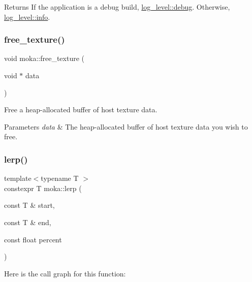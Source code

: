 \begin{DoxyReturn}{Returns}
If the application is a debug build, \mbox{\hyperlink{namespacemoka_a7c4111664aee7737c54ab37376b2637daad42f6697b035b7580e4fef93be20b4d}{log\+\_\+level\+::debug}}. Otherwise, \mbox{\hyperlink{namespacemoka_a7c4111664aee7737c54ab37376b2637dacaf9b6b99962bf5c2264824231d7a40c}{log\+\_\+level\+::info}}. 
\end{DoxyReturn}
\mbox{\label{namespacemoka_a6c4641e3deed82e275bcd034dfd4c09a}} 
\subsubsection{\texorpdfstring{free\_texture()}{free\_texture()}}
{\footnotesize\ttfamily void moka\+::free\+\_\+texture (\begin{DoxyParamCaption}\item[{void $\ast$}]{data }\end{DoxyParamCaption})}



Free a heap-\/allocated buffer of host texture data. 


\begin{DoxyParams}{Parameters}
{\em data} & The heap-\/allocated buffer of host texture data you wish to free. \\
\hline
\end{DoxyParams}
\mbox{\label{namespacemoka_ad97379de09141d046fe34261117b09b9}} 
\subsubsection{\texorpdfstring{lerp()}{lerp()}}
{\footnotesize\ttfamily template$<$typename T $>$ \\
constexpr T moka\+::lerp (\begin{DoxyParamCaption}\item[{const T \&}]{start,  }\item[{const T \&}]{end,  }\item[{const float}]{percent }\end{DoxyParamCaption})\hspace{0.3cm}{\ttfamily [noexcept]}}

Here is the call graph for this function\+:
\mbox{\label{namespacemoka_af5a96c8550737bc497ab5f87af7c9596}} 
